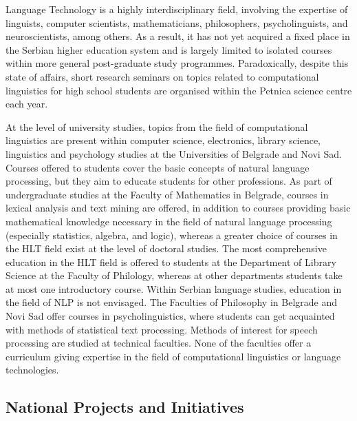 \begin{multicols}{2}
Language Technology is a highly interdisciplinary field, involving the expertise of linguists, computer scientists, mathematicians, philosophers, psycholinguists, and neuroscientists, among others. As a result, it has not yet acquired a fixed place in the Serbian higher education system and is largely limited to isolated courses within more general post-graduate study programmes. Paradoxically, despite this state of affairs, short research seminars on topics related to computational linguistics for high school students are organised within the Petnica science centre \cite{PETNICA} each year. 

At the level of university studies, topics from the field of computational linguistics are present within computer science, electronics, library science, linguistics and psychology studies at the Universities of Belgrade and Novi Sad. Courses offered to students cover the basic concepts of natural language processing, but they aim to educate students for other professions. As part of undergraduate studies at the Faculty of Mathematics in Belgrade, courses in lexical analysis and text mining are offered, in addition to courses providing basic mathematical knowledge necessary in the field of natural language processing (especially statistics, algebra, and logic), whereas a greater choice of courses in the HLT field exist at the level of doctoral studies. The most comprehensive education in the HLT field is offered to students at the Department of Library Science at the Faculty of Philology, whereas at other departments students take at most one introductory course. Within Serbian language studies, education in the field of NLP is not envisaged. The Faculties of Philosophy in Belgrade and Novi Sad offer courses in psycholinguistics, where students can get acquainted with methods of statistical text processing. Methods of interest for speech processing are studied at technical faculties. None of the faculties offer a curriculum giving expertise in the field of computational linguistics or language technologies. 
 

 \subsection {National Projects and Initiatives}


\end{multicols}
